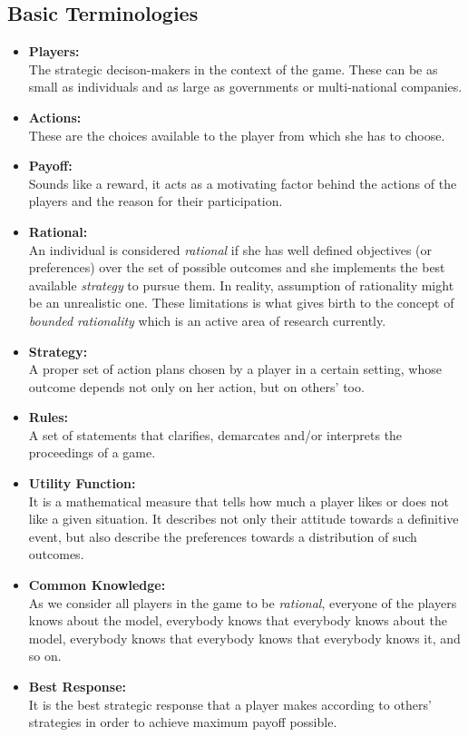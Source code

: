\subsection{Basic Terminologies}
	\begin{itemize}
	\item \textbf{Players:}\\
	The strategic decison-makers in the context of the game. These can be as small as individuals and as large as governments or multi-national companies.
	\item \textbf{Actions:}\\
	These are the choices available to the player from which she has to choose.
	\item \textbf{Payoff:}\\
	Sounds like a reward, it acts as a motivating factor behind the actions of the players and the reason for their participation.
	\item \textbf{Rational:}\\
		An individual is considered \textit{rational} if she has well defined objectives (or preferences) over the set of possible outcomes and she implements the best available \textit{strategy} to pursue them. In reality, assumption of rationality might be an unrealistic one. These limitations is what gives birth to the concept of \textit{bounded rationality} which is an active area of research currently.
	\item \textbf{Strategy:}\\
	A proper set of action plans chosen by a player in a certain setting, whose outcome depends not only on her action, but on others' too.
	\item \textbf{Rules:}\\
	A set of statements that clarifies, demarcates and/or interprets the proceedings of a game.  
	\item \textbf{Utility Function:}\\
	It is a mathematical measure that tells how much a player likes or does not like a given situation. It describes not only their attitude towards a definitive event, but also describe the preferences towards a distribution of such outcomes.
	\item \textbf{Common Knowledge:}\\
	As we consider all players in the game to be \textit{rational}, everyone of the players knows about the model, everybody knows that everybody knows about the model, everybody knows that everybody knows that everybody knows it, and so on.
	\item \textbf{Best Response:}\\
	It is the best strategic response that a player makes according to others' strategies in order to achieve maximum payoff possible.
	\end{itemize}
